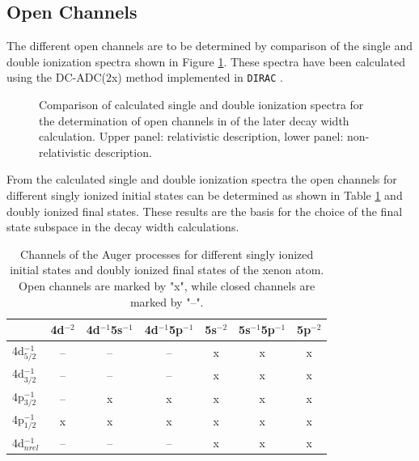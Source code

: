 \subsection{Open Channels}
The different open channels are to be determined by comparison of the single
and double ionization spectra shown in Figure \ref{figure:Xe_sdip}.
These spectra have been calculated using the
DC-ADC(2x) method implemented in \verb|DIRAC|
\cite{Pernpointner04_1,Pernpointner10_1,DIRAC13}.

\begin{figure}[]
  \centering
  
  
  \caption{Comparison of calculated single and double ionization spectra
           for the determination of open channels in of the later decay
           width calculation. Upper panel: relativistic description, lower
           panel: non-relativistic description.
           }
  \label{figure:Xe_sdip}
\end{figure}


From the calculated single and double ionization spectra the open channels
for different singly ionized initial states can be determined as shown in 
Table \ref{table:Xe_open_channels} and doubly ionized final states.
These results are the basis for the choice of the final state subspace
in the decay width calculations.
\begin{table}[h]
  \centering
  \caption{Channels of the Auger processes for different singly ionized
           initial states and doubly ionized final states
           of the xenon atom. Open channels are marked by "x", while closed
           channels are marked by "--".}
  \begin{tabular}{lcccccc}
   \toprule
                   & 4d$^{-2}$ & 4d$^{-1}$5s$^{-1}$ & 4d$^{-1}$5p$^{-1}$ & 5s$^{-2}$ & 5s$^{-1}$5p$^{-1}$ & 5p$^{-2}$ \\
   \midrule
   4d$_{5/2}^{-1}$ &      --   &       --           &        --          &     x     &     x              &     x     \\
   4d$_{3/2}^{-1}$ &      --   &       --           &        --          &     x     &     x              &     x     \\
   4p$_{3/2}^{-1}$ &      --   &        x           &         x          &     x     &     x              &     x     \\
   4p$_{1/2}^{-1}$ &       x   &        x           &         x          &     x     &     x              &     x     \\
   \midrule
   4d$^{-1}_{nrel}$&      --   &       --           &        --          &     x     &     x              &     x     \\
   \bottomrule
  \end{tabular}
  \label{table:Xe_open_channels}
\end{table}




